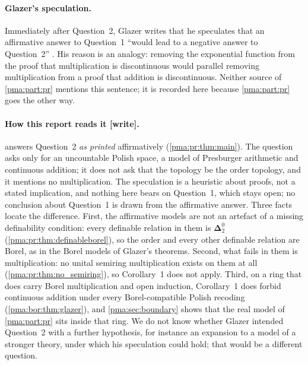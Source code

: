 \documentclass[11pt]{article}
\numberwithin{equation}{section}
\theoremstyle{definition}
\theoremstyle{remark}
\newcommand{\Dtwo}{\boldsymbol{\Delta}^{0}_{2}}
\newcommand{\writetag}{\textup{\textsf{\small[write]}}}
\begin{document}
\paragraph{Glazer's speculation.} Immediately after Question~2, Glazer
writes that he speculates that an affirmative answer to Question~1
``would lead to a negative answer to Question~2'' \cite[p.~8]{Glazer}. His
reason is an analogy: removing the exponential function from the proof that
multiplication is discontinuous would parallel removing multiplication from
a proof that addition is discontinuous. Neither source of \cref{pma:part:pr}
mentions this sentence; it is recorded here because \cref{pma:part:pr} goes
the other way.

\paragraph{How this report reads it \writetag.}  answers
Question~2 \emph{as printed} affirmatively (\cref{pma:pr:thm:main}). The
question asks only for an uncountable Polish space, a model of Presburger
arithmetic and continuous addition; it does not ask that the topology be the
order topology, and it mentions no multiplication. The speculation is a
heuristic about proofs, not a stated implication, and nothing here bears on
Question~1, which stays open; no conclusion about Question~1 is drawn from
the affirmative answer. Three facts locate the difference. First, the
affirmative models are not an artefact of a missing definability condition:
every definable relation in them is $\Dtwo$
(\cref{pma:pr:thm:definableborel}), so the order and every other definable
relation are Borel, as in the Borel models of Glazer's theorems. Second, what fails in them is multiplication: no
unital semiring multiplication exists on them at all
(\cref{pma:pr:thm:no_semiring}), so Corollary~1 does not apply. Third, on a
ring that does carry Borel multiplication and open induction, Corollary~1
does forbid continuous addition under every Borel-compatible Polish recoding
(\cref{pma:bor:thm:glazer}), and \cref{pma:sec:boundary} shows that the real
model of \cref{pma:part:pr} sits inside that ring. We do not know whether
Glazer intended Question~2 with a further hypothesis, for instance an
expansion to a model of a stronger theory, under which his speculation could
hold; that would be a different question.
\end{document}
